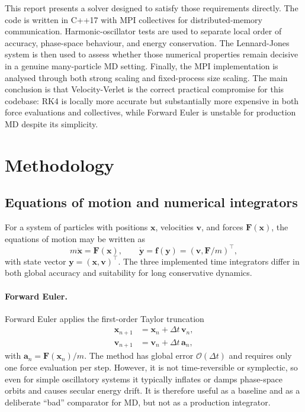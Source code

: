 \documentclass[10pt,twocolumn]{article}
\begin{document}
This report presents a solver designed to satisfy those requirements directly. The code is written in C++17 with MPI collectives for distributed-memory communication. Harmonic-oscillator tests are used to separate local order of accuracy, phase-space behaviour, and energy conservation. The Lennard-Jones system is then used to assess whether those numerical properties remain decisive in a genuine many-particle MD setting. Finally, the MPI implementation is analysed through both strong scaling and fixed-process size scaling. The main conclusion is that Velocity-Verlet is the correct practical compromise for this codebase: RK4 is locally more accurate but substantially more expensive in both force evaluations and collectives, while Forward Euler is unstable for production MD despite its simplicity.

\section{Methodology}

\subsection{Equations of motion and numerical integrators}

For a system of particles with positions $\mathbf{x}$, velocities $\mathbf{v}$, and forces $\mathbf{F}(\mathbf{x})$, the equations of motion may be written as
\begin{equation}
 m\ddot{\mathbf{x}} = \mathbf{F}(\mathbf{x}), \qquad
 \dot{\mathbf{y}} = \mathbf{f}(\mathbf{y}) = (\mathbf{v},\mathbf{F}/m)^\top,
\end{equation}
with state vector $\mathbf{y}=(\mathbf{x},\mathbf{v})^\top$. The three implemented time integrators differ in both global accuracy and suitability for long conservative dynamics.

\paragraph{Forward Euler.}
Forward Euler applies the first-order Taylor truncation
\begin{align}
\mathbf{x}_{n+1} &= \mathbf{x}_n + \Delta t\,\mathbf{v}_n, \\
\mathbf{v}_{n+1} &= \mathbf{v}_n + \Delta t\,\mathbf{a}_n,
\end{align}
with $\mathbf{a}_n = \mathbf{F}(\mathbf{x}_n)/m$. The method has global error $\mathcal{O}(\Delta t)$ and requires only one force evaluation per step. However, it is not time-reversible or symplectic, so even for simple oscillatory systems it typically inflates or damps phase-space orbits and causes secular energy drift. It is therefore useful as a baseline and as a deliberate ``bad'' comparator for MD, but not as a production integrator.
\end{document}

